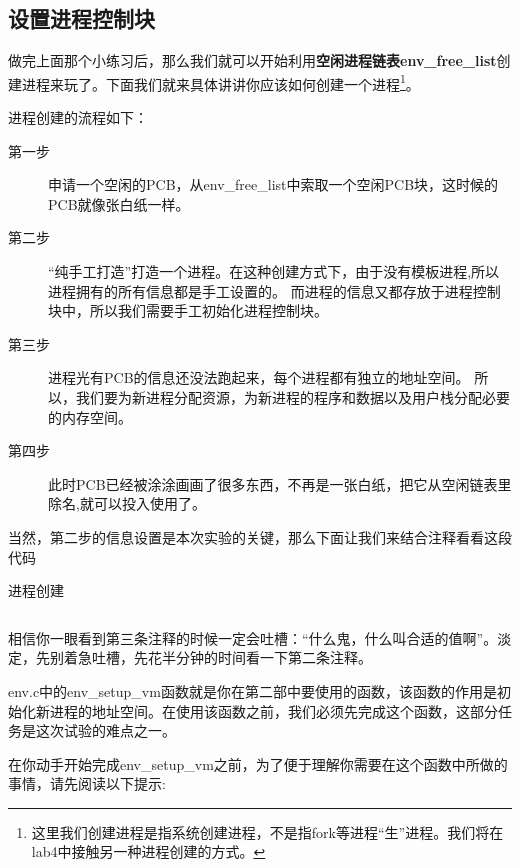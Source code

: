 \subsection{设置进程控制块}

做完上面那个小练习后，那么我们就可以开始利用\textbf{空闲进程链表env\_free\_list}创建进程来玩了。下面我们就来具体讲讲你应该如何创建一个进程\footnote{这里我们创建进程是指系统创建进程，不是指fork等进程“生”进程。我们将在lab4中接触另一种进程创建的方式。}。

进程创建的流程如下：

\begin{description}
  \item[第一步] 申请一个空闲的PCB，从env\_free\_list中索取一个空闲PCB块，这时候的PCB就像张白纸一样。
  \item[第二步] “纯手工打造”打造一个进程。在这种创建方式下，由于没有模板进程,所以进程拥有的所有信息都是手工设置的。
  而进程的信息又都存放于进程控制块中，所以我们需要手工初始化进程控制块。
  \item[第三步] 进程光有PCB的信息还没法跑起来，每个进程都有独立的地址空间。\label{process-3}
  所以，我们要为新进程分配资源，为新进程的程序和数据以及用户栈分配必要的内存空间。
  \item[第四步] 此时PCB已经被涂涂画画了很多东西，不再是一张白纸，把它从空闲链表里除名,就可以投入使用了。
\end{description}

当然，第二步的信息设置是本次实验的关键，那么下面让我们来结合注释看看这段代码

\begin{codeBoxWithCaption}{进程创建\label{code:env_alloc.c}}
  \inputminted[linenos]{c}{codes/env_alloc.c}
\end{codeBoxWithCaption}

相信你一眼看到第三条注释的时候一定会吐槽：“什么鬼，什么叫合适的值啊”。淡定，先别着急吐槽，先花半分钟的时间看一下第二条注释。

env.c中的env\_setup\_vm函数就是你在第二部中要使用的函数，该函数的作用是初始化新进程的地址空间。在使用该函数之前，我们必须先完成这个函数，这部分任务是这次试验的难点之一。


在你动手开始完成env\_setup\_vm之前，为了便于理解你需要在这个函数中所做的事情，请先阅读以下提示:

